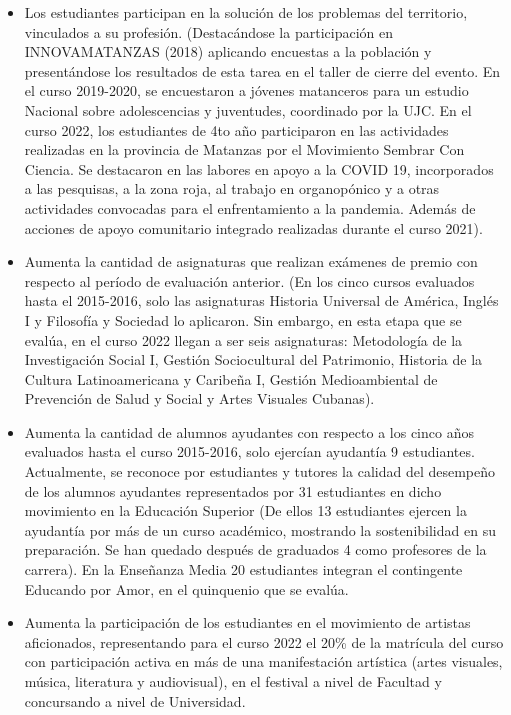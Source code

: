 \begin{itemize}
	\item Los estudiantes participan en la solución de los problemas del territorio, vinculados a su profesión. (Destacándose la participación en INNOVAMATANZAS (2018) aplicando encuestas a la población y presentándose los resultados de esta tarea en el taller de cierre del evento. En el curso 2019-2020, se encuestaron a jóvenes matanceros para un estudio Nacional sobre adolescencias y juventudes, coordinado por la UJC. En el curso 2022, los estudiantes de 4to año participaron en las actividades realizadas en la provincia de Matanzas por el Movimiento Sembrar Con Ciencia. Se destacaron en las labores en apoyo a la COVID 19, incorporados a las pesquisas, a la zona roja, al trabajo en organopónico y a otras actividades convocadas para el enfrentamiento a la pandemia. Además de acciones de apoyo comunitario integrado realizadas durante el curso 2021).
	
	\item Aumenta la cantidad de asignaturas que realizan exámenes de premio con respecto al período de evaluación anterior. (En los cinco cursos evaluados hasta el 2015-2016, solo las asignaturas Historia Universal de América, Inglés I y Filosofía y Sociedad lo aplicaron. Sin embargo, en esta etapa que se evalúa,  en el curso 2022 llegan a ser seis asignaturas: Metodología de la Investigación Social I, Gestión Sociocultural del Patrimonio, Historia de la Cultura Latinoamericana y Caribeña I, Gestión Medioambiental de Prevención de Salud y Social y Artes Visuales Cubanas). 
	
	\item Aumenta la cantidad de alumnos ayudantes con respecto a los cinco años evaluados hasta el curso 2015-2016, solo ejercían ayudantía 9 estudiantes. Actualmente, se reconoce por estudiantes y tutores la calidad del desempeño de los alumnos ayudantes representados por 31 estudiantes en dicho movimiento en la Educación Superior (De ellos 13 estudiantes ejercen la ayudantía por más de un curso académico, mostrando la sostenibilidad en su preparación. Se han quedado después de graduados 4 como profesores de la carrera). En la Enseñanza Media 20 estudiantes integran el contingente Educando por Amor, en el quinquenio que se evalúa.
	
	\item Aumenta la participación de los estudiantes en el movimiento de artistas aficionados, representando para el curso 2022 el 20\% de la matrícula del curso con participación activa en más de una manifestación artística (artes visuales, música, literatura y audiovisual), en el festival a nivel de Facultad y concursando a nivel de Universidad.
	

\end{itemize}
